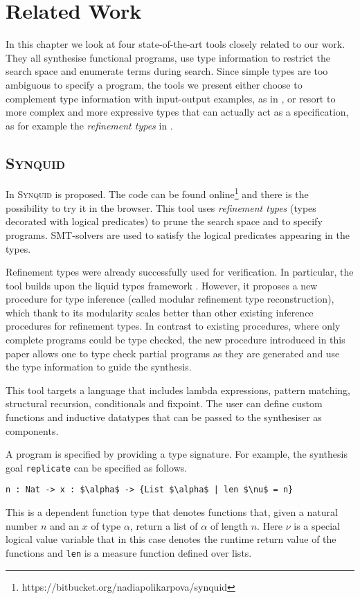 \lstset{style=plain}

\chapter{Related Work} \label{ch:relatedwork}

In this chapter we look at four state-of-the-art tools closely related to our work. They all synthesise functional programs, use type information to restrict the search space and enumerate terms during search. Since simple types are too ambiguous to specify a program, the tools we present either choose to complement type information with input-output examples, as in \cite{LambdaSquarePaper, EscherPaper, MythPaper}, or resort to more complex and more expressive types that can actually act as a specification, as for example the \emph{refinement types} in \cite{SynquidPaper}.

\section{\mdseries\textsc{Synquid}}

In \cite{SynquidPaper} \textsc{Synquid} is proposed. The code can be found online\footnote{https://bitbucket.org/nadiapolikarpova/synquid} and there is the possibility to try it in the browser.
This tool uses \emph{refinement types} (types decorated with logical predicates) to prune the search space and to specify programs. SMT-solvers are used to satisfy the logical predicates appearing in the types.

Refinement types were already successfully used for verification. In particular, the tool builds upon the liquid types framework \cite{LiquidTypes}. However, it proposes a new procedure for type inference (called modular refinement type reconstruction), which thank to its modularity scales better than other existing inference procedures for refinement types. In contrast to existing procedures, where only complete programs could be type checked, the new procedure introduced in this paper allows one to type check partial programs as they are generated and use the type information to guide the synthesis.

This tool targets a language that includes lambda expressions, pattern matching, structural recursion, conditionals and fixpoint.
The user can define custom functions and inductive datatypes that can be passed to the synthesiser as components.

A program is specified by providing a type signature. For example, the synthesis goal \lstinline!replicate! can be specified as follows.
\begin{lstlisting}[style=plain]
n : Nat -> x : $\alpha$ -> {List $\alpha$ | len $\nu$ = n}
\end{lstlisting}
This is a dependent function type that denotes functions that, given a natural number $n$ and an $x$ of type $\alpha$, return a list of $\alpha$ of length $n$. Here $\nu$ is a special logical value variable that in this case denotes the runtime return value of the functions and \lstinline!len! is a measure function defined over lists.


